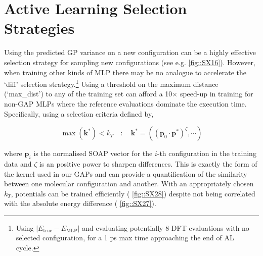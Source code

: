 \documentclass[11pt]{article}
\numberwithin{equation}{subsection}
\begin{document}
\clearpage
\section{Active Learning Selection Strategies}  \label{section::SI_AL_strategies}


Using the predicted GP variance on a new configuration can be a highly effective selection strategy for sampling new configurations (see e.g. \figurename{ \ref{fig::SX16}}). However, when training other kinds of MLP there may be no analogue to accelerate the `diff' selection strategy.\footnote{Using $|E_\text{true} - E_\text{MLP}|$ and evaluating potentially 8 DFT evaluations with no selected configuration, for a 1 ps max time approaching the end of AL cycle.} Using a threshold on the maximum distance (`max\_dist') to any of the training set can afford a 10$\times$ speed-up in training for non-GAP MLPs where the reference evaluations dominate the execution time. Specifically, using a selection criteria defined by,

\begin{equation}
	\max(\boldsymbol{k}^*) < k_T \quad : \quad \boldsymbol{k}^* = ((\boldsymbol{p}_0 \cdot \boldsymbol{p}^*)^\zeta, \cdots)
\end{equation}

where $\boldsymbol{p}_i$ is the normalised SOAP vector for the $i$-th configuration in the training data and $\zeta$ is an positive power to sharpen differences. This is exactly the form of the kernel used in our GAPs and can provide a quantification of the similarity between one molecular configuration and another. With an appropriately chosen $k_T$, potentials can be trained efficiently (\figurename{ \ref{fig::SX28}}) despite not being correlated with the absolute energy difference (\figurename{ \ref{fig::SX27}}). 
\end{document}

